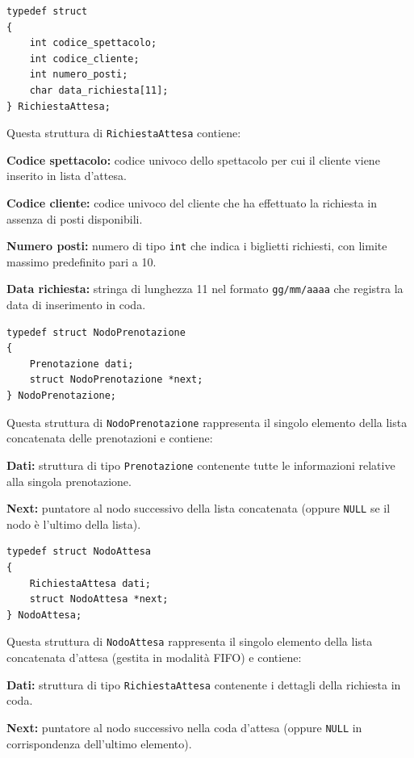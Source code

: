 \documentclass[11pt,a4paper,oneside,openany]{book}
\newenvironment{listacomp}{%
    \small
    \begin{list}{\textendash}{%
        \setlength{\topsep}{2pt}%
        \setlength{\partopsep}{0pt}%
        \setlength{\itemsep}{1pt}%
        \setlength{\parsep}{0pt}%
        \setlength{\leftmargin}{1.2em}%
    }%
}{%
    \end{list}%
}
\begin{document}
\begin{lstlisting}[caption={Definizione della struttura RichiestaAttesa}]
typedef struct
{
    int codice_spettacolo;
    int codice_cliente;
    int numero_posti;
    char data_richiesta[11];
} RichiestaAttesa;
\end{lstlisting}
Questa struttura di \texttt{RichiestaAttesa} contiene:
\begin{listacomp}
    \item \textbf{Codice spettacolo:} codice univoco dello spettacolo per cui il cliente viene inserito in lista d'attesa.
    \item \textbf{Codice cliente:} codice univoco del cliente che ha effettuato la richiesta in assenza di posti disponibili.
    \item \textbf{Numero posti:} numero di tipo \texttt{int} che indica i biglietti richiesti, con limite massimo predefinito pari a 10.
    \item \textbf{Data richiesta:} stringa di lunghezza 11 nel formato \texttt{gg/mm/aaaa} che registra la data di inserimento in coda.
\end{listacomp}

\begin{lstlisting}[caption={Definizione della struttura NodoPrenotazione}]
typedef struct NodoPrenotazione
{
    Prenotazione dati;
    struct NodoPrenotazione *next;
} NodoPrenotazione;
\end{lstlisting}
Questa struttura di \texttt{NodoPrenotazione} rappresenta il singolo elemento della lista concatenata delle prenotazioni e contiene:
\begin{listacomp}
    \item \textbf{Dati:} struttura di tipo \texttt{Prenotazione} contenente tutte le informazioni relative alla singola prenotazione.
    \item \textbf{Next:} puntatore al nodo successivo della lista concatenata (oppure \texttt{NULL} se il nodo è l'ultimo della lista).
\end{listacomp}

\begin{lstlisting}[caption={Definizione della struttura NodoAttesa}]
typedef struct NodoAttesa
{
    RichiestaAttesa dati;
    struct NodoAttesa *next;
} NodoAttesa;
\end{lstlisting}
Questa struttura di \texttt{NodoAttesa} rappresenta il singolo elemento della lista concatenata d'attesa (gestita in modalità FIFO) e contiene:
\begin{listacomp}
    \item \textbf{Dati:} struttura di tipo \texttt{RichiestaAttesa} contenente i dettagli della richiesta in coda.
    \item \textbf{Next:} puntatore al nodo successivo nella coda d'attesa (oppure \texttt{NULL} in corrispondenza dell'ultimo elemento).
\end{listacomp}
\end{document}
